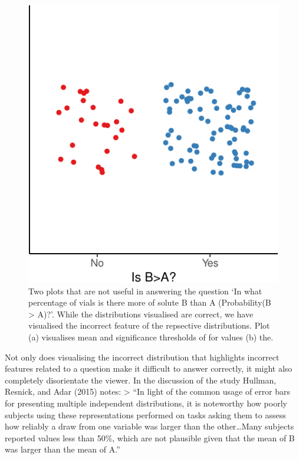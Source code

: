 \documentclass[
  letterpaper,
  DIV=11,
  numbers=noendperiod]{scrartcl}
\begin{document}
\begin{figure}
\begin{minipage}[t]{0.50\linewidth}
{{\includegraphics{confirmationreport_files/figure-pdf/fig-bad-2.pdf}

}

}

\end{minipage}%

\caption{\label{fig-bad}Two plots that are not useful in answering the
question `In what percentage of vials is there more of solute B than A
(Probability(B \textgreater{} A)?'. While the distributions visualised
are correct, we have visualised the incorrect feature of the repsective
distributions. Plot (a) visualises mean and significance thresholds of
for values (b) the.}

\end{figure}

Not only does visualising the incorrect distribution that highlights
incorrect features related to a question make it difficult to answer
correctly, it might also completely disorientate the viewer. In the
discussion of the study Hullman, Resnick, and Adar (2015) notes:
\textgreater{} ``In light of the common usage of error bars for
presenting multiple independent distributions, it is noteworthy how
poorly subjects using these representations performed on tasks asking
them to assess how reliably a draw from one variable was larger than the
other\ldots Many subjects reported values less than 50\%, which are not
plausible given that the mean of B was larger than the mean of A.''
\end{document}
